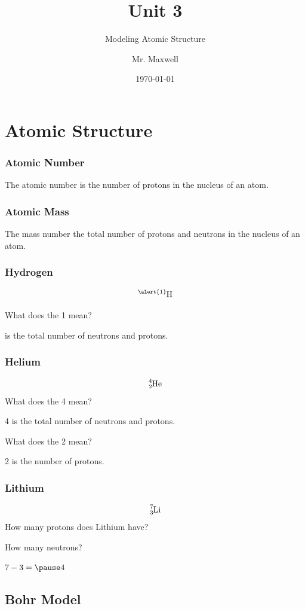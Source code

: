 \documentclass{beamer}
\title{Unit 3}
\subtitle{Modeling Atomic Structure}
\author{Mr. Maxwell}
\institute{PACS}
\date{\today}
\begin{document}
\frame{\titlepage}

\section{Atomic Structure}

\begin{frame}
    \frametitle{Atomic Number}
\onslide The 
 \pause \alert{atomic number}
 \onslide is the number of 
 \pause \alert{protons} 
 \onslide in the nucleus of an atom.
\end{frame}


\begin{frame}
    \frametitle{Atomic Mass}
    \onslide The 
     \pause \alert{mass number}
     \onslide the total number of
     \pause \alert{protons} 
     \onslide and
     \pause \alert{neutrons} 
     \onslide in the nucleus of an atom.
    \end{frame}

\begin{frame}
    \frametitle{Hydrogen}
    $$\ce{^{\alert{1}}_{}H}$$

    \pause What does the \alert{1} mean?

     is the total number of neutrons and protons.
\end{frame}


\begin{frame}
    \frametitle{Helium}
 $$\ce{^{4}_{2}He}$$
    \pause What does the \alert{4} mean?

    \pause \alert{4} is the total number of neutrons and protons.

    \pause What does the \alert{2} mean?

    \pause \alert{2} is the number of protons.
\end{frame}

\begin{frame}
    \frametitle{Lithium}
 $$\ce{^{7}_{3}Li}$$
    \pause How many protons does Lithium have?


    \pause How many neutrons?

    \pause $7 - 3 = \pause 4 $

\end{frame}

\subsection{Bohr Model}
\end{document}
